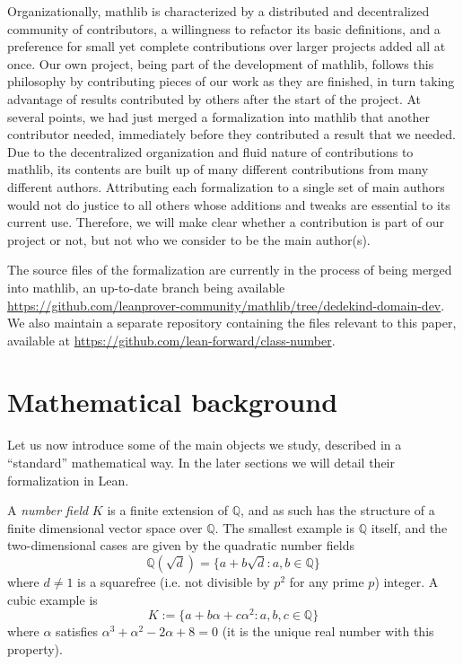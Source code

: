 \documentclass[a4paper,USenglish,cleveref, autoref, thm-restate]{lipics-v2021}
\newcommand{\mathlib}{\textsf{mathlib}\xspace}
\newcommand{\Q}{\mathbb{Q}}
\begin{document}
Organizationally, \mathlib is characterized by a distributed and decentralized community of contributors, a willingness to refactor its basic definitions, and a preference for small yet complete contributions over larger projects added all at once.
Our own project, being part of the development of \mathlib, follows this philosophy by contributing pieces of our work as they are finished,
in turn taking advantage of results contributed by others after the start of the project.
At several points, we had just merged a formalization into \mathlib that another contributor needed,
immediately before they contributed a result that we needed.
Due to the decentralized organization and fluid nature of contributions to mathlib, its contents are built up of many different contributions from many different authors. Attributing each formalization to a single set of main authors would not do justice to all others whose additions and tweaks are essential to its current use. Therefore, we will make clear whether a contribution is part of our project or not, but not who we consider to be the main author(s).

The source files of the formalization are currently in the process of being merged into \mathlib, an up-to-date branch being available \url{https://github.com/leanprover-community/mathlib/tree/dedekind-domain-dev}. We also maintain a separate repository containing the files relevant to this paper, available at \url{https://github.com/lean-forward/class-number}.

\section{Mathematical background}\label{sec math background}

Let us now introduce some of the main objects we study, described in a ``standard'' mathematical way. In the later sections we will detail their formalization in Lean.

A \emph{number field} $K$ is a finite extension of $\Q$, and as such has the structure of a finite dimensional vector space over $\Q$. The smallest example is $\Q$ itself, and the two-dimensional cases are given by the quadratic number fields
\[
  \Q(\sqrt{d})=\{a+b\sqrt{d} : a,b \in \Q\}
\]
where $d\not=1$ is a squarefree (i.e. not divisible by $p^2$ for any prime $p$) integer. %
A cubic example is
\[K:=\{a+b\alpha+c \alpha^2: a,b,c \in \Q\}\]
where $\alpha$ satisfies $\alpha^3 + \alpha^2 - 2\alpha + 8=0$ (it is the unique real number with this property).
\end{document}

